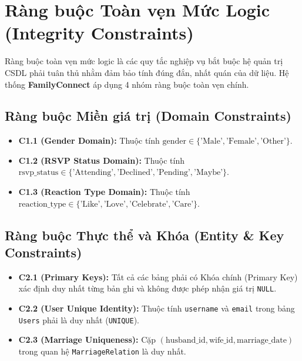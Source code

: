 \section{Ràng buộc Toàn vẹn Mức Logic (Integrity Constraints)}
\label{sec:2_4_rang_buoc_logic}

Ràng buộc toàn vẹn mức logic là các quy tắc nghiệp vụ bắt buộc hệ quản trị CSDL phải tuân thủ nhằm đảm bảo tính đúng đắn, nhất quán của dữ liệu. Hệ thống \textbf{FamilyConnect} áp dụng 4 nhóm ràng buộc toàn vẹn chính.

\subsection{Ràng buộc Miền giá trị (Domain Constraints)}
\label{subsec:2_4_1_domain}

\begin{itemize}
    \item \textbf{C1.1 (Gender Domain):} Thuộc tính $\text{gender} \in \{\text{'Male'}, \text{'Female'}, \text{'Other'}\}$.
    \item \textbf{C1.2 (RSVP Status Domain):} Thuộc tính $\text{rsvp\_status} \in \{\text{'Attending'}, \text{'Declined'}, \text{'Pending'}, \text{'Maybe'}\}$.
    \item \textbf{C1.3 (Reaction Type Domain):} Thuộc tính $\text{reaction\_type} \in \{\text{'Like'}, \text{'Love'}, \text{'Celebrate'}, \text{'Care'}\}$.
\end{itemize}

\subsection{Ràng buộc Thực thể và Khóa (Entity \& Key Constraints)}
\label{subsec:2_4_2_entity_key}

\begin{itemize}
    \item \textbf{C2.1 (Primary Keys):} Tất cả các bảng phải có Khóa chính (Primary Key) xác định duy nhất từng bản ghi và không được phép nhận giá trị \texttt{NULL}.
    \item \textbf{C2.2 (User Unique Identity):} Thuộc tính \texttt{username} và \texttt{email} trong bảng \texttt{Users} phải là duy nhất (\texttt{UNIQUE}).
    \item \textbf{C2.3 (Marriage Uniqueness):} Cặp $(\text{husband\_id}, \text{wife\_id}, \text{marriage\_date})$ trong quan hệ \texttt{MarriageRelation} là duy nhất.
\end{itemize}


